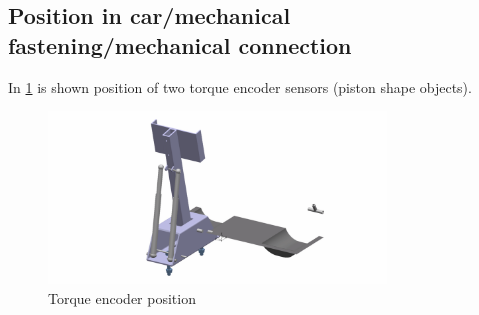 \subsection{Position in car/mechanical fastening/mechanical connection}
In \ref{fig:torque_encoder_position} is shown position of two torque encoder sensors (piston shape objects).

\begin{figure}[H]
\begin{center}
	\includegraphics[width=0.8\textwidth]{./img/ACC-pedal-pos.jpg}
	\caption{Torque encoder position}
	\label{fig:torque_encoder_position}
\end{center}
\end{figure}





